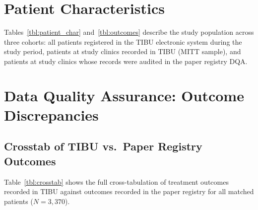 \documentclass[12pt]{article}
\begin{document}
\section{Patient Characteristics}

Tables~\ref{tbl:patient_char} and~\ref{tbl:outcomes} describe the study
population across three cohorts: all patients registered in the TIBU electronic
system during the study period, patients at study clinics recorded in TIBU
(MITT sample), and patients at study clinics whose records were audited in the
paper registry DQA.

\renewcommand{\thetable}{1a}
\begin{table}[H]
    \centering
    \caption{Individual and disease characteristics across TIBU and paper registry cohorts.}
    \label{tbl:patient_char}
    
\end{table}

\renewcommand{\thetable}{1b}
\begin{table}[H]
    \centering
    \caption{Treatment outcomes across TIBU and paper registry cohorts.}
    \label{tbl:outcomes}
    
\end{table}
\setcounter{table}{1}
\renewcommand{\thetable}{\arabic{table}}

\section{Data Quality Assurance: Outcome Discrepancies}

\subsection{Crosstab of TIBU vs.\ Paper Registry Outcomes}

Table~\ref{tbl:crosstab} shows the full cross-tabulation of treatment outcomes
recorded in TIBU against outcomes recorded in the paper registry for all
matched patients ($N = 3{,}370$).

\begin{table}[H]
    \centering
    \caption{Cross-tabulation of treatment outcomes in TIBU vs.\ paper registry.}
    \label{tbl:crosstab}
    \resizebox{\textwidth}{!}{}
\end{table}
\end{document}
